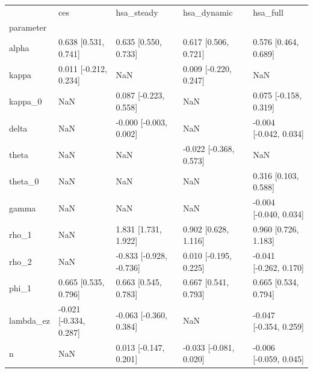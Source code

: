 \begin{tabular}{lllll}
\toprule
 & ces & hsa\_steady & hsa\_dynamic & hsa\_full \\
parameter &  &  &  &  \\
\midrule
alpha & 0.638 [0.531, 0.741] & 0.635 [0.550, 0.733] & 0.617 [0.506, 0.721] & 0.576 [0.464, 0.689] \\
kappa & 0.011 [-0.212, 0.234] & NaN & 0.009 [-0.220, 0.247] & NaN \\
kappa\_0 & NaN & 0.087 [-0.223, 0.558] & NaN & 0.075 [-0.158, 0.319] \\
delta & NaN & -0.000 [-0.003, 0.002] & NaN & -0.004 [-0.042, 0.034] \\
theta & NaN & NaN & -0.022 [-0.368, 0.573] & NaN \\
theta\_0 & NaN & NaN & NaN & 0.316 [0.103, 0.588] \\
gamma & NaN & NaN & NaN & -0.004 [-0.040, 0.034] \\
rho\_1 & NaN & 1.831 [1.731, 1.922] & 0.902 [0.628, 1.116] & 0.960 [0.726, 1.183] \\
rho\_2 & NaN & -0.833 [-0.928, -0.736] & 0.010 [-0.195, 0.225] & -0.041 [-0.262, 0.170] \\
phi\_1 & 0.665 [0.535, 0.796] & 0.663 [0.545, 0.783] & 0.667 [0.541, 0.793] & 0.665 [0.534, 0.794] \\
lambda\_ez & -0.021 [-0.334, 0.287] & -0.063 [-0.360, 0.384] & NaN & -0.047 [-0.354, 0.259] \\
n & NaN & 0.013 [-0.147, 0.201] & -0.033 [-0.081, 0.020] & -0.006 [-0.059, 0.045] \\
\bottomrule
\end{tabular}
